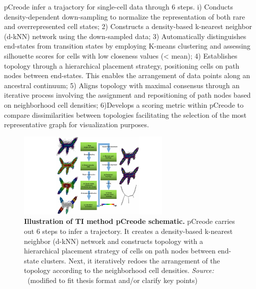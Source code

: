 \begin{itemize}
    pCreode infer a trajactory for single-cell data through 6 steps\citep{herring2018pCreode}. i) Conducts density-dependent down-sampling to normalize the representation of both rare and overrepresented cell states; 2) Constructs a density-based k-nearest neighbor (d-kNN) network using the down-sampled data; 3) Automatically distinguishes end-states from transition states by employing K-means clustering and assessing silhouette scores for cells with low closeness values (< mean); 4) Establishes topology through a hierarchical placement strategy, positioning cells on path nodes between end-states. This enables the arrangement of data points along an ancestral continuum; 5) Aligns topology with maximal consensus through an iterative process involving the assignment and repositioning of path nodes based on neighborhood cell densities; 6)Develops a scoring metric within pCreode to compare dissimilarities between topologies facilitating the selection of the most representative graph for visualization purposes.
    \begin{figure}[ht!]
    	\centering
    	\includegraphics[width=0.65\textwidth]{TI_Alg_pCreode/fig}
    	\vspace{0.1cm}
    	\caption[Illustration of TI method pCreode schematic.]{\textbf{Illustration of TI method pCreode schematic.} pCreode carries out 6 steps to infer a trajectory. It creates a density-based k-nearest neighbor (d-kNN) network and constructs topology with a hierarchical placement strategy of cells on path nodes between end-state clusters. Next, it iteratively redoes the arrangement of the topology according to the neighborhood cell densities. \emph{Source: ~\cite{herring2018pCreode}}(modified to fit thesis format and/or clarify key points)
    	}
    	\label{fig:TI_Alg_pCreode}
    \end{figure}    


\end{itemize}
